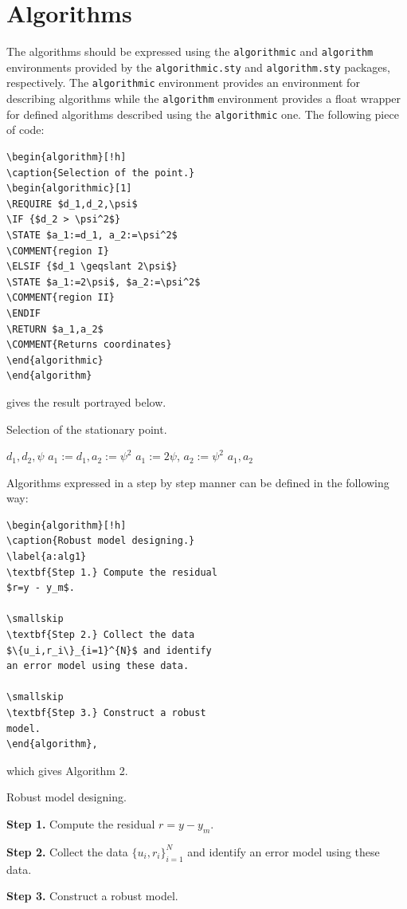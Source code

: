 \documentclass{amcs}
\begin{document}
\section{Algorithms}
The algorithms should be expressed using the \verb+algorithmic+ and \verb+algorithm+ environments provided by the \verb+algorithmic.sty+ and \verb+algorithm.sty+ packages, respectively. The \verb+algorithmic+ environment provides an environment for describing algorithms while the \verb+algorithm+ environment provides a float wrapper for defined algorithms described using the \verb+algorithmic+ one. The following piece of code:
\begin{verbatim}
\begin{algorithm}[!h]
\caption{Selection of the point.}
\begin{algorithmic}[1]
\REQUIRE $d_1,d_2,\psi$
\IF {$d_2 > \psi^2$}
\STATE $a_1:=d_1, a_2:=\psi^2$
\COMMENT{region I}
\ELSIF {$d_1 \geqslant 2\psi$}
\STATE $a_1:=2\psi$, $a_2:=\psi^2$
\COMMENT{region II}
\ENDIF
\RETURN $a_1,a_2$
\COMMENT{Returns coordinates}
\end{algorithmic}
\end{algorithm}
\end{verbatim}
gives the result portrayed below.
\begin{algorithm}[!h]
\caption{Selection of the stationary point.}
\label{a:alg}
\begin{algorithmic}[1]
\REQUIRE $d_1,d_2,\psi$
\STATE $a_1:=d_1, a_2:=\psi^2$
\STATE $a_1:=2\psi$, $a_2:=\psi^2$
\ENDIF
\RETURN $a_1,a_2$
\end{algorithmic}
\end{algorithm}

Algorithms expressed in a step by step manner can be defined in the following way:
\begin{verbatim}
\begin{algorithm}[!h]
\caption{Robust model designing.}
\label{a:alg1}
\textbf{Step 1.} Compute the residual
$r=y - y_m$.

\smallskip
\textbf{Step 2.} Collect the data
$\{u_i,r_i\}_{i=1}^{N}$ and identify
an error model using these data.

\smallskip
\textbf{Step 3.} Construct a robust
model.
\end{algorithm},
\end{verbatim}
which gives Algorithm 2.
\begin{algorithm}[!h]
\caption{Robust model designing.}
\label{a:alg1}
\textbf{Step 1.} Compute the residual $r=y - y_m$.

\smallskip
\textbf{Step 2.} Collect the data $\{u_i,r_i\}_{i=1}^{N}$ and identify an error model using these data.

\smallskip
\textbf{Step 3.} Construct a robust model.
\end{algorithm}
\end{document}

